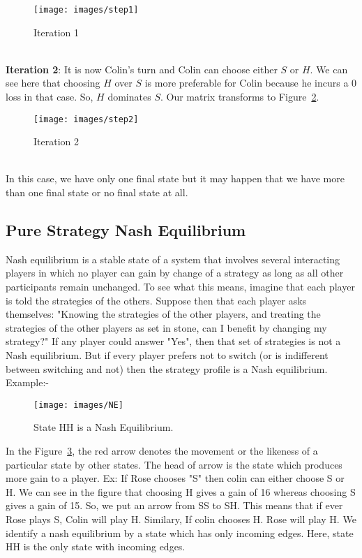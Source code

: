 \begin{figure}[h!]
\centering
\texttt{[image: images/step1]}
\caption{Iteration 1}
\label{figure6}
\end{figure}\\
\textbf{Iteration 2}: It is now Colin's turn and Colin can choose either $S$ or $H$.
We can see here that choosing $H$ over $S$ is more preferable for Colin because he incurs a 0 loss in that case. So, $H$ dominates $S$. Our matrix transforms to Figure~\ref{figure7}.
\begin{figure}[h!]
\centering
\texttt{[image: images/step2]}
\caption{Iteration 2}
\label{figure7}
\end{figure}\\
In this case, we have only one final state but it may happen that we have more than one final state or no final state at all. 
\subsection{Pure Strategy Nash Equilibrium}
Nash equilibrium is a stable state of a system that involves several interacting players in which no player can gain by change of a strategy as long as all other participants remain unchanged. To see what this means, imagine that each player is told the strategies of the others. Suppose then that each player asks themselves: "Knowing the strategies of the other players, and treating the strategies of the other players as set in stone, can I benefit by changing my strategy?"
If any player could answer "Yes", then that set of strategies is not a Nash equilibrium. But if every player prefers not to switch (or is indifferent between switching and not) then the strategy profile is a Nash equilibrium.\\
Example:-
\begin{figure}[h!]
\centering
\texttt{[image: images/NE]}
\caption{State HH is a Nash Equilibrium.}
\label{figure8}
\end{figure}

In the Figure~\ref{figure8}, the red arrow denotes the movement or the likeness of a particular state by other states. The head of arrow is the state which produces more gain to a player. Ex: If Rose chooses "S" then colin can either choose S or H. We can see in the figure that choosing H gives a gain of 16 whereas choosing S gives a gain of 15. So, we put an arrow from SS to SH. This means that if ever Rose plays S, Colin will play H. Similary, If colin chooses H. Rose will play H. We identify a nash equilibrium by a state which has only incoming edges. Here, state HH is the only state with incoming edges.\\

